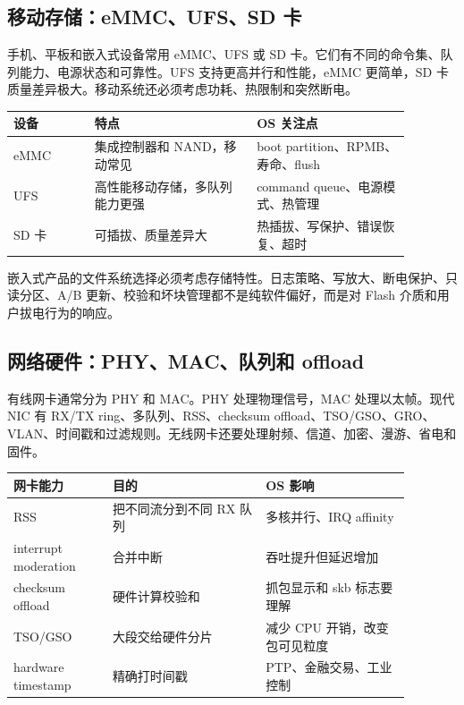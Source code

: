 \subsection{移动存储：eMMC、UFS、SD 卡}

手机、平板和嵌入式设备常用 eMMC、UFS 或 SD 卡。它们有不同的命令集、队列能力、电源状态和可靠性。UFS 支持更高并行和性能，eMMC 更简单，SD 卡质量差异极大。移动系统还必须考虑功耗、热限制和突然断电。

\begin{longtable}{p{0.18\linewidth}p{0.36\linewidth}p{0.34\linewidth}}
\toprule
设备 & 特点 & OS 关注点 \\
\midrule
eMMC & 集成控制器和 NAND，移动常见 & boot partition、RPMB、寿命、flush \\
UFS & 高性能移动存储，多队列能力更强 & command queue、电源模式、热管理 \\
SD 卡 & 可插拔、质量差异大 & 热插拔、写保护、错误恢复、超时 \\
\bottomrule
\end{longtable}

嵌入式产品的文件系统选择必须考虑存储特性。日志策略、写放大、断电保护、只读分区、A/B 更新、校验和坏块管理都不是纯软件偏好，而是对 Flash 介质和用户拔电行为的响应。

\subsection{网络硬件：PHY、MAC、队列和 offload}

有线网卡通常分为 PHY 和 MAC。PHY 处理物理信号，MAC 处理以太帧。现代 NIC 有 RX/TX ring、多队列、RSS、checksum offload、TSO/GSO、GRO、VLAN、时间戳和过滤规则。无线网卡还要处理射频、信道、加密、漫游、省电和固件。

\begin{longtable}{p{0.22\linewidth}p{0.34\linewidth}p{0.32\linewidth}}
\toprule
网卡能力 & 目的 & OS 影响 \\
\midrule
RSS & 把不同流分到不同 RX 队列 & 多核并行、IRQ affinity \\
interrupt moderation & 合并中断 & 吞吐提升但延迟增加 \\
checksum offload & 硬件计算校验和 & 抓包显示和 skb 标志要理解 \\
TSO/GSO & 大段交给硬件分片 & 减少 CPU 开销，改变包可见粒度 \\
hardware timestamp & 精确打时间戳 & PTP、金融交易、工业控制 \\
\bottomrule
\end{longtable}

